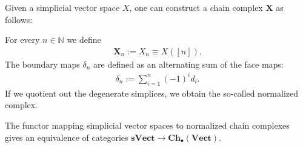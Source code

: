     Given a simplicial vector space $X$, one can construct a chain complex $\mathbf{X}$ as follows:
    \begin{construct}
        For every $n\in\mathbb{N}$ we define
        \begin{gather}
            \mathbf{X}_n := X_n \equiv X([n]).
        \end{gather}
        The boundary maps $\delta_n$ are defined as an alternating sum of the face maps:
        \begin{gather}
            \delta_n := \sum_{i=1}^n(-1)^id_i.
        \end{gather}
        If we quotient out the degenerate simplices, we obtain the so-called normalized complex.
    \end{construct}
    \begin{theorem}\label{sheaf:dold_kan}
        The functor mapping simplicial vector spaces to normalized chain complexes gives an equivalence of categories $\mathbf{sVect}\rightarrow\mathbf{Ch}_\bullet(\mathbf{Vect})$.
    \end{theorem}